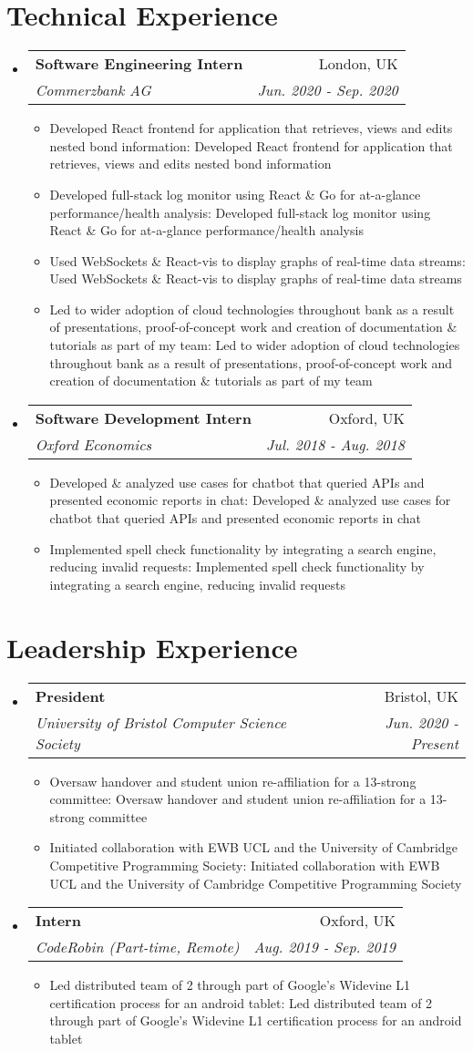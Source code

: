 \documentclass[a4paper,11pt]{article}
\makeatletter
\def \ifempty#1{\def\temp{#1} \ifx\temp\empty }
\newcommand{\resumeItem}[2]{
  \item\small{
  	\ifempty{#1}#2\else\textbf{#1}{: #2 \vspace{-2pt}}\fi
  }
}
\newcommand{\resumeSubheading}[4]{
  \vspace{-1pt}\item
    \begin{tabular*}{0.97\textwidth}{l@{\extracolsep{\fill}}r}
      \textbf{#1} & #2 \\
      \textit{\small#3} & \textit{\small #4} \\
    \end{tabular*}\vspace{-5pt}
}
\newcommand{\resumeSubHeadingListStart}{\begin{itemize}[leftmargin=*]}
\newcommand{\resumeSubHeadingListEnd}{\end{itemize}}
\newcommand{\resumeItemListStart}{\begin{itemize}}
\newcommand{\resumeItemListEnd}{\end{itemize}\vspace{-5pt}}
\makeatother
\begin{document}
\section{Technical Experience}
  \resumeSubHeadingListStart
    \resumeSubheading
      {Software Engineering Intern}{London, UK}
      {Commerzbank AG}{Jun. 2020 - Sep. 2020}
      \resumeItemListStart
      	\resumeItem{}
          {Developed React frontend for application that retrieves, views and edits nested bond information}
        \resumeItem{}
          {Developed full-stack log monitor using React \& Go for at-a-glance performance/health analysis}
        \resumeItem{}
          {Used WebSockets \& React-vis to display graphs of real-time data streams}
        \resumeItem{}
          {Led to wider adoption of cloud technologies throughout bank as a result of presentations, proof-of-concept work and creation of documentation \& tutorials as part of my team}
      \resumeItemListEnd
    \resumeSubheading
      {Software Development Intern}{Oxford, UK}
      {Oxford Economics}{Jul. 2018 - Aug. 2018}
      \resumeItemListStart
      	\resumeItem{}
          {Developed \& analyzed use cases for chatbot that queried APIs and presented economic reports in chat}
        \resumeItem{}  
          {Implemented spell check functionality by integrating a search 
          engine, reducing invalid requests}
      \resumeItemListEnd
  \resumeSubHeadingListEnd


\section{Leadership Experience}
  \resumeSubHeadingListStart
    \resumeSubheading
      {President}{Bristol, UK}
      {University of Bristol Computer Science Society}{Jun. 2020 - Present}
      \resumeItemListStart
        \resumeItem{}
          {Oversaw handover and student union re-affiliation for a 13-strong committee}
        \resumeItem{}
          {Initiated collaboration with EWB UCL and the University of Cambridge Competitive Programming Society}
      \resumeItemListEnd
    \resumeSubheading
      {Intern}{Oxford, UK}
      {CodeRobin (Part-time, Remote)}{Aug. 2019 - Sep. 2019}
      \resumeItemListStart
      	\resumeItem{}
          {Led distributed team of 2 through part of Google's Widevine L1 certification process for an android tablet}
      \resumeItemListEnd
  \resumeSubHeadingListEnd


\end{document}
